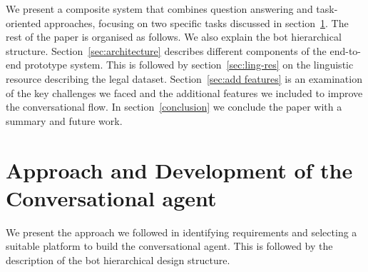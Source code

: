 \documentclass[runningheads]{llncs}
\begin{document}
We present a composite system that combines question answering and task-oriented approaches, focusing on two specific tasks discussed in section~\ref{step by step}. The rest of the paper is organised as follows. We also explain the bot hierarchical structure. Section~\ref{sec:architecture} describes different components of the end-to-end prototype system. This is followed by section~\ref{sec:ling-res} on the linguistic resource describing the legal dataset. Section~\ref{sec:add features} is an examination of the key challenges we faced and the additional features we included to improve the conversational flow. In section~\ref{conclusion} we conclude the paper with a summary and future work.

\section{Approach and Development of the Conversational agent}\label{step by step}
We present the approach we followed in identifying requirements and selecting a suitable platform to build the conversational agent. This is followed by the description of the bot hierarchical design structure.
\end{document}
